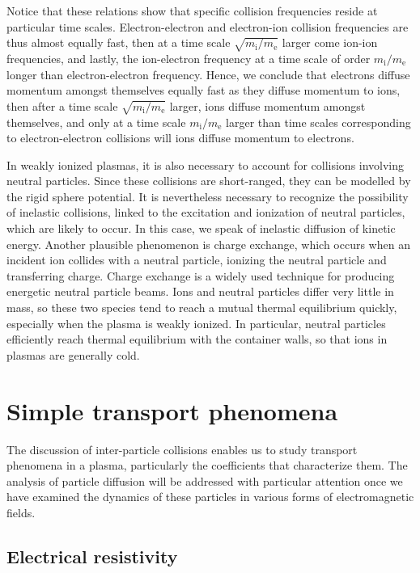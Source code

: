 Notice that these relations show that specific collision frequencies reside at particular time scales. Electron-electron and electron-ion collision frequencies are thus almost equally fast, then at a time scale $\sqrt{m_\mathrm{i}/m_\text{e}}$ larger come ion-ion frequencies, and lastly, the ion-electron frequency at a time scale of order $m_\mathrm{i}/m_\text{e}$ longer than electron-electron frequency. Hence, we conclude that electrons diffuse momentum amongst themselves equally fast as they diffuse momentum to ions, then after a time scale $\sqrt{m_\mathrm{i}/m_\text{e}}$ larger, ions diffuse momentum amongst themselves, and only at a time scale $m_\mathrm{i}/m_\text{e}$ larger than time scales corresponding to electron-electron collisions will ions diffuse momentum to electrons.

\quad In weakly ionized plasmas, it is also necessary to account for collisions involving neutral particles. Since these collisions are short-ranged, they can be modelled by the rigid sphere potential. It is nevertheless necessary to recognize the possibility of inelastic collisions, linked to the excitation and ionization of neutral particles, which are likely to occur. In this case, we speak of inelastic diffusion of kinetic energy. Another plausible phenomenon is charge exchange, which occurs when an incident ion collides with a neutral particle, ionizing the neutral particle and transferring charge. Charge exchange is a widely used technique for producing energetic neutral particle beams. Ions and neutral particles differ very little in mass, so these two species tend to reach a mutual thermal equilibrium quickly, especially when the plasma is weakly ionized. In particular, neutral particles efficiently reach thermal equilibrium with the container walls, so that ions in plasmas are generally cold.

\section{Simple transport phenomena}

The discussion of inter-particle collisions enables us to study transport phenomena in a plasma, particularly the coefficients that characterize them. The analysis of particle diffusion will be addressed with particular attention once we have examined the dynamics of these particles in various forms of electromagnetic fields.

\subsection{Electrical resistivity}

